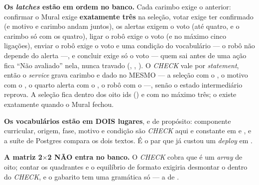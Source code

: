 \begin{regra}
\textbf{Os \emph{latches} estão em ordem no banco.} Cada carimbo exige o
anterior: confirmar o Mural exige \textbf{exatamente três} na seleção, votar
exige ter confirmado (e motivo e carimbo andam juntos), os alertas exigem o
voto (até quatro, e o carimbo só com os quatro), ligar o robô exige o voto (e
no máximo cinco ligações), enviar o robô exige o voto e uma condição do
vocabulário --- o robô não depende do alerta ---, e concluir exige só o voto
--- quem sai antes de uma ação fica \enquote{Não avaliado} nela, nunca
travado (, , ). O
\emph{CHECK} vale por \emph{statement}, então o \emph{service} grava carimbo e
dado no MESMO  --- a seleção com o , o motivo
com o , o quarto alerta com o , o robô com o
 ---, senão o estado intermediário reprova. A seleção fica dentro dos oito ids () e com no máximo três; o  existe
exatamente quando o Mural fechou.

\textbf{Os vocabulários estão em DOIS lugares}, e de propósito: componente
curricular, origem, fase, motivo e condição são \emph{CHECK} aqui e constante em
 e , e a suíte de Postgres compara os dois
textos. É o par que já custou um \emph{deploy} em .

\textbf{A matriz 2$\times$2 NÃO entra no banco.} O \emph{CHECK} cobra que
 é um \emph{array} de oito; contar os quadrantes e o
equilíbrio de formato exigiria desmontar o  dentro do \emph{CHECK}, e o
gabarito tem uma gramática só --- a de .
\end{regra}

